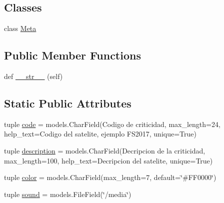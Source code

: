 \subsection*{Classes}
\begin{DoxyCompactItemize}
\item 
class \hyperlink{class_ground_segment_1_1models_1_1_alarm_1_1_criticity_1_1_criticity_1_1_meta}{Meta}
\end{DoxyCompactItemize}
\subsection*{Public Member Functions}
\begin{DoxyCompactItemize}
\item 
def \hyperlink{class_ground_segment_1_1models_1_1_alarm_1_1_criticity_1_1_criticity_a5d57294aac104240387d30b90f52e373}{\+\_\+\+\_\+str\+\_\+\+\_\+} (self)
\end{DoxyCompactItemize}
\subsection*{Static Public Attributes}
\begin{DoxyCompactItemize}
\item 
tuple \hyperlink{class_ground_segment_1_1models_1_1_alarm_1_1_criticity_1_1_criticity_a40e1efee5388c763ea32538c5fbc2077}{code} = models.\+Char\+Field(\textquotesingle{}Codigo de criticidad\textquotesingle{}, max\+\_\+length=24, help\+\_\+text=\textquotesingle{}Codigo del satelite, ejemplo F\+S2017\textquotesingle{}, unique=True)
\item 
tuple \hyperlink{class_ground_segment_1_1models_1_1_alarm_1_1_criticity_1_1_criticity_ae4c538dfc524b4715722c42d6bf23f06}{description} = models.\+Char\+Field(\textquotesingle{}Decripcion de la criticidad\textquotesingle{}, max\+\_\+length=100, help\+\_\+text=\textquotesingle{}Decripcion del satelite\textquotesingle{}, unique=True)
\item 
tuple \hyperlink{class_ground_segment_1_1models_1_1_alarm_1_1_criticity_1_1_criticity_a6421ed3051ec960dd0ed52e4dd9cd88e}{color} = models.\+Char\+Field(max\+\_\+length=7, default=\char`\"{}\#F\+F0000\char`\"{})
\item 
tuple \hyperlink{class_ground_segment_1_1models_1_1_alarm_1_1_criticity_1_1_criticity_a1cd251b97d58bdfcb133ba4cf85675f7}{sound} = models.\+File\+Field(\char`\"{}/media\char`\"{})
\end{DoxyCompactItemize}


